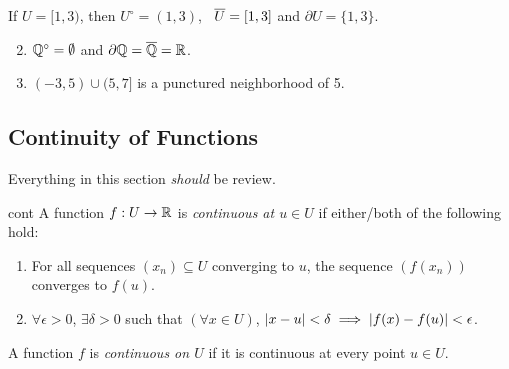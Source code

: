 \begin{examples}{}{}
	\exstart If $U=[1,3)$, then $U^\circ=(1,3)$, \ $\overline{U}=[1,3]$ and $\partial U=\{1,3\}$.
	\begin{enumerate}\setcounter{enumi}{1}
	  \item $\mathbb{Q}^\circ=\emptyset$ and $\partial\mathbb{Q}=\overline{\mathbb{Q}}=\mathbb{R}$.
	  \item $(-3,5)\cup (5,7]$ is a punctured neighborhood of 5.
	\end{enumerate}
\end{examples}


\goodbreak
\clearpage


\setcounter{subsection}{16}
\subsection{Continuity of Functions}\label{sec:cont}

Everything in this section \emph{should} be review.

\begin{defn}{}{cont}
	A function $f:U\to\mathbb{R}$ is \emph{continuous at $u\in U$} if either/both of the following hold:
	\begin{enumerate}
	  \item For all sequences $(x_n)\subseteq U$ converging to $u$, the sequence $(f(x_n))$ converges to $f(u)$.
	  \item $\forall\epsilon>0$, $\exists\delta>0$ such that $(\forall x\in U)$, $\left| x-u\right|<\delta\implies\left| f(x)-f(u)\right|<\epsilon$.
	\end{enumerate}
	A function $f$ is \emph{continuous on $U$} if it is continuous at every point $u\in U$.
\end{defn}


